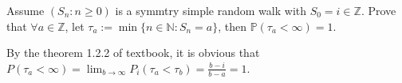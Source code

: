 \documentclass{ctexart}
\begin{document}
\begin{problem}\label{pro:4}
  Assume \((S_n:n \geq 0)\) is a symmtry simple random walk with \(S_0 = i \in \mathbb{Z}\).
  Prove that \(\forall a \in \mathbb{Z}\), let \(\tau_a:=\min\{n \in \mathbb{N}:S_n=a \}\), then \(\mathbb{P}(\tau_a < \infty) = 1 \).
\end{problem}
\begin{solution}
  By the theorem 1.2.2 of textbook, it is obvious that \(P(\tau_a < \infty)=\lim_{b \to \infty}P_i(\tau_a<\tau_b)=\frac{b-i}{b-a}=1\).
\end{solution}
\end{document}
